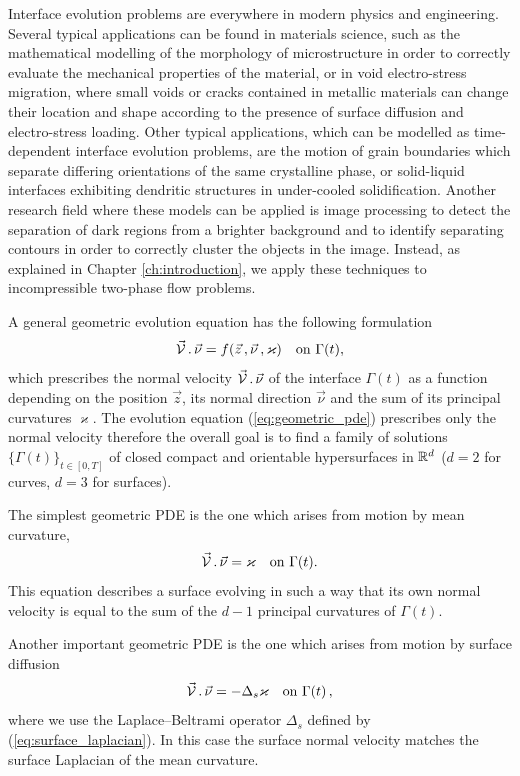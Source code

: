 Interface evolution problems are everywhere in modern physics and engineering.
Several typical applications can be found in materials science, such as the
mathematical modelling of the morphology of microstructure in order to
correctly evaluate the mechanical properties of the material, or in void
electro-stress migration, where small voids or cracks contained in metallic
materials can change their location and shape according to the presence of
surface diffusion and electro-stress loading. Other typical applications, which
can be modelled as time-dependent interface evolution problems, are the motion
of grain boundaries which separate differing orientations of the same
crystalline phase, or solid-liquid interfaces exhibiting dendritic structures in
under-cooled solidification. Another research field where these models can be
applied is image processing to detect the separation of dark regions from a
brighter background and to identify separating contours in order to correctly
cluster the objects in the image. Instead, as explained in Chapter
\ref{ch:introduction}, we apply these techniques to incompressible two-phase
flow problems.

A general geometric evolution equation has the following formulation
\begin{equation}\label{eq:geometric_pde}
\vec{\mathcal{V}}\,.\,\vec\nu=f(\vec z\,,\vec \nu\,,\varkappa)
\quad\mbox{on }\Gamma(t),
\end{equation}
which prescribes the normal velocity $\vec{\mathcal{V}}\,.\,\vec\nu$ of the
interface $\Gamma(t)$ as a function depending on the position $\vec z$, its
normal direction $\vec \nu$ and the sum of its principal curvatures
$\varkappa$. The evolution equation (\ref{eq:geometric_pde}) prescribes only
the normal velocity therefore the overall goal is to find a family of
solutions $\{ \Gamma(t) \}_{t \in [0, T]}$ of closed compact and orientable
hypersurfaces in $\mathbb R^d$ ($d = 2$ for curves, $d = 3$ for surfaces).

The simplest geometric PDE is the one which arises from motion by mean
curvature,
\begin{equation}\label{eq:mean_curvature}
\vec{\mathcal{V}}\,.\,\vec\nu=\varkappa\quad\mbox{on }\Gamma(t).
\end{equation}
This equation describes a surface evolving in such a way that its own normal
velocity is equal to the sum of the $d-1$ principal curvatures of $\Gamma(t)$.

Another important geometric PDE is the one which arises from motion by
surface diffusion
\begin{equation}\label{eq:surface_diff}
\vec{\mathcal{V}}\,.\,\vec\nu=-\Delta_s \varkappa \quad\mbox{on }\Gamma(t)\,,
\end{equation}
where we use the Laplace--Beltrami operator $\Delta_s$ defined by
(\ref{eq:surface_laplacian}). In this case the surface normal velocity matches
the surface Laplacian of the mean curvature.

